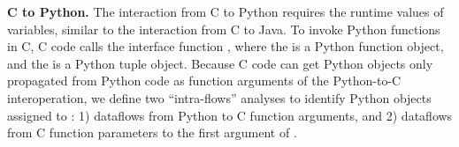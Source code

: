 \medskip

\textbf{C to Python.} The interaction from C to Python requires the runtime
values of variables, similar to the interaction from C to Java. 
To invoke Python functions in C, C code calls the interface function
, where the  is a Python
function object, and the  is a Python tuple object. 
Because C code can get Python objects only propagated from Python code as
function arguments of the Python-to-C interoperation, we define two
``intra-flows'' analyses to identify Python objects assigned to :
1) dataflows from Python to C function arguments, and 2) dataflows from C
function parameters to the first argument of . 


